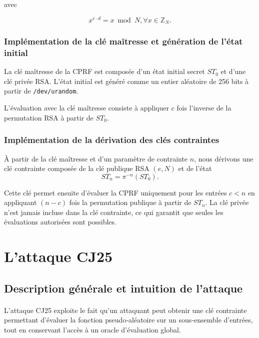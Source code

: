 \documentclass[9pt]{extarticle}
\begin{document}
avec 

\[
x^{e \cdot d} = x \bmod N , \forall x \in \mathbb{Z}_N.
\] 


\subsubsection{Implémentation de la clé maîtresse et génération de l’état initial}

La clé maîtresse de la CPRF est composée d’un état initial secret $ST_0$ et d’une clé
privée RSA. L’état initial est généré comme un entier aléatoire de 256 bits à partir de
\texttt{/dev/urandom}.

L’évaluation avec la clé maîtresse consiste à appliquer $c$ fois l’inverse de la permutation
RSA à partir de $ST_0$.

\subsubsection{Implémentation de la dérivation des clés contraintes}

À partir de la clé maîtresse et d’un paramètre de contrainte $n$, nous dérivons une clé
contrainte composée de la clé publique RSA $(e, N)$ et de l’état
\[
ST_n = \pi^{-n}(ST_0).
\]

Cette clé permet ensuite d’évaluer la CPRF uniquement pour les entrées $c < n$ en
appliquant $(n-c)$ fois la permutation publique à partir de $ST_n$. La clé privée n’est
jamais incluse dans la clé contrainte, ce qui garantit que seules les évaluations autorisées
sont possibles.



\section{L'attaque CJ25}

\subsection{Description générale et intuition de l’attaque}

\paragraph{}
L’attaque CJ25 exploite le fait qu’un attaquant peut obtenir une clé contrainte
permettant d’évaluer la fonction pseudo‑aléatoire sur un sous‑ensemble d’entrées,
tout en conservant l’accès à un oracle d’évaluation global.
\end{document}
